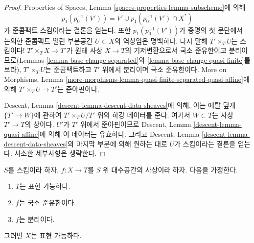 \begin{proof}
\medskip\noindent
Properties of Spaces, Lemma \ref{spaces-properties-lemma-subscheme}에 의해
$$
p_1(p_0^{-1}(V')) =
V' \cup p_1(p_0^{-1}(V') \cap X^*)
$$
가 준콤팩트 스킴이라는 결론을 얻는다. 또한
$p_1(p_0^{-1}(V'))$가 증명의 첫 문단에서 논의한 준콤팩트 열린 부분공간
$U \subset X$의 역상임은 명백하다. 다시 말해 $T' \times_T U$는
스킴이다! $T' \times_T X \to T'$가 원래 사상 $X \to T$의
기저변환으로서 국소 준유한이고 분리이므로(Lemmas
\ref{lemma-base-change-separated}와 \ref{lemma-base-change-quasi-finite}를
보라), $T' \times_T U$는 준콤팩트하고 $T'$ 위에서 분리이며 국소
준유한이다. More on Morphisms, Lemma
\ref{more-morphisms-lemma-quasi-finite-separated-quasi-affine}에 의해
$T' \times_T U \to T'$는 준아핀이다.

\medskip\noindent
Descent, Lemma \ref{descent-lemma-descent-data-sheaves}에 의해, 이는 에탈
덮개 $\{T' \to W\}$에 관하여 $T' \times_T U / T'$ 위의 하강 데이터를
준다. 여기서 $W \subset T$는 사상 $T' \to T$의 상이다.
$U'$가 $T'$ 위에서 준아핀이므로 Descent, Lemma
\ref{descent-lemma-quasi-affine}에 의해 이 데이터는 유효하다. 그리고
Descent, Lemma \ref{descent-lemma-descent-data-sheaves}의 마지막 부분에
의해 원하는 대로 $U$가 스킴이라는 결론을 얻는다. 사소한 세부사항은
생략한다.
\end{proof}

\begin{proposition}
\label{proposition-locally-quasi-finite-separated-over-scheme}
$S$를 스킴이라 하자. $f : X \to T$를 $S$ 위 대수공간의 사상이라 하자.
다음을 가정한다.
\begin{enumerate}
\item $T$는 표현 가능하다.
\item $f$는 국소 준유한이다.
\item $f$는 분리이다.
\end{enumerate}
그러면 $X$는 표현 가능하다.
\end{proposition}

